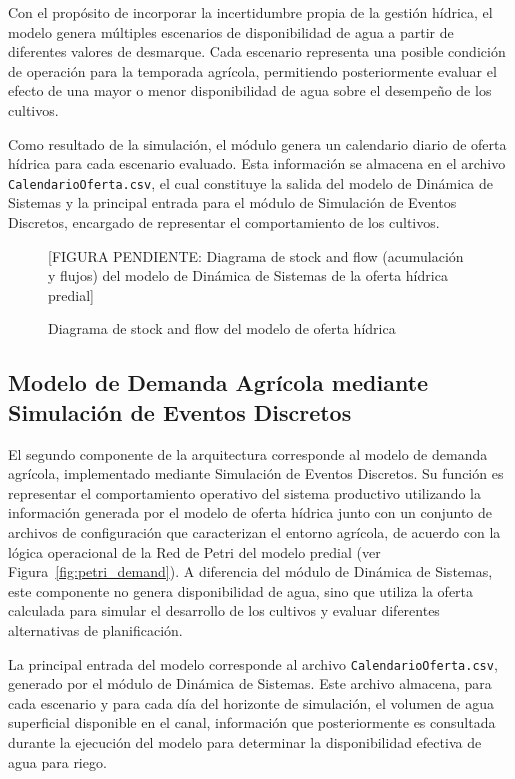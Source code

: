 \documentclass[12pt]{report}
\begin{document}
Con el propósito de incorporar la incertidumbre propia de la gestión hídrica, el modelo genera múltiples escenarios de disponibilidad de agua a partir de diferentes valores de desmarque. Cada escenario representa una posible condición de operación para la temporada agrícola, permitiendo posteriormente evaluar el efecto de una mayor o menor disponibilidad de agua sobre el desempeño de los cultivos.

Como resultado de la simulación, el módulo genera un calendario diario de oferta hídrica para cada escenario evaluado. Esta información se almacena en el archivo \texttt{CalendarioOferta.csv}, el cual constituye la salida del modelo de Dinámica de Sistemas y la principal entrada para el módulo de Simulación de Eventos Discretos, encargado de representar el comportamiento de los cultivos.

\begin{figure}[H]
    \centering
    \vspace{0.3cm}
    [FIGURA PENDIENTE: Diagrama de stock and flow (acumulación y flujos) del modelo de Dinámica de Sistemas de la oferta hídrica predial]
    \caption{Diagrama de stock and flow del modelo de oferta hídrica}
    \label{fig:oferta_stock_flow}
\end{figure}

\subsection{Modelo de Demanda Agrícola mediante Simulación de Eventos Discretos}

El segundo componente de la arquitectura corresponde al modelo de demanda agrícola, implementado mediante Simulación de Eventos Discretos. Su función es representar el comportamiento operativo del sistema productivo utilizando la información generada por el modelo de oferta hídrica junto con un conjunto de archivos de configuración que caracterizan el entorno agrícola, de acuerdo con la lógica operacional de la Red de Petri del modelo predial (ver Figura~\ref{fig:petri_demand}). A diferencia del módulo de Dinámica de Sistemas, este componente no genera disponibilidad de agua, sino que utiliza la oferta calculada para simular el desarrollo de los cultivos y evaluar diferentes alternativas de planificación.

La principal entrada del modelo corresponde al archivo \texttt{CalendarioOferta.csv}, generado por el módulo de Dinámica de Sistemas. Este archivo almacena, para cada escenario y para cada día del horizonte de simulación, el volumen de agua superficial disponible en el canal, información que posteriormente es consultada durante la ejecución del modelo para determinar la disponibilidad efectiva de agua para riego.
\end{document}
